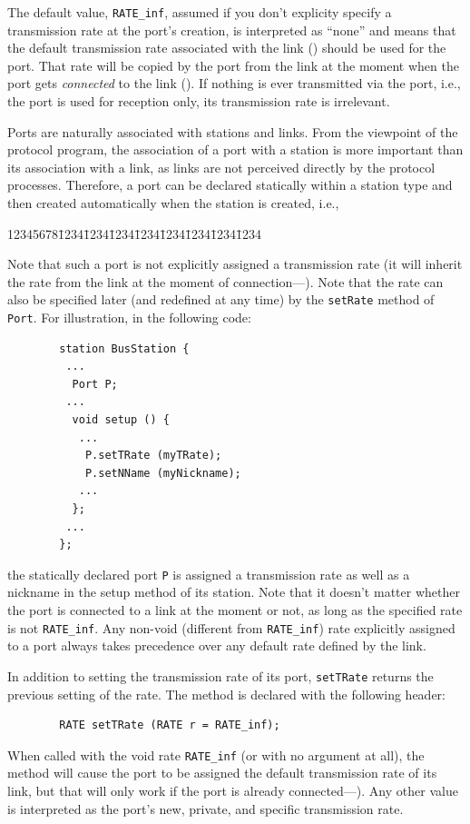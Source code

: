 The default value, {\tt RATE\_inf}, assumed if you don't explicity specify a
transmission rate at the port's creation, is interpreted as ``none'' and
means that the default transmission rate associated with the link
() should be used for the port.
That rate will be copied by the port from the link at the moment when
the port gets
{\em connected\/} to the link ().
If nothing is ever transmitted via the port, i.e., the port
is used for reception only, its transmission rate is irrelevant.

Ports are naturally associated with stations and links.
From the viewpoint of the protocol program, the association of a port
with a station is more important than its association with a link, as
links are not perceived directly by the protocol processes.
Therefore, a port can be declared statically within a
station type and then created automatically when the station is created, i.e.,
{\tt\begin{tabbing}
12345678\=1234\=1234\=1234\=1234\=1234\=1234\=1234\=1234\kill
{}
\end{tabbing}}
\noindent
Note that such a port is not explicitly assigned a transmission rate (it
will inherit the rate from the link at the moment of
connection---).
Note that the rate can also be specified later (and redefined at any time)
by the {\tt setRate} method of {\tt Port}.
For illustration, in the following code:
\begin{verbatim}
        station BusStation {
         ...
          Port P;
         ...
          void setup () {
           ...
            P.setTRate (myTRate);
            P.setNName (myNickname);
           ...
          };
         ...
        };
\end{verbatim}
\noindent
the statically declared port {\tt P} is assigned a transmission rate as well
as a nickname in the setup method of its station.
Note that it doesn't matter whether the port is connected to a link
at the moment
or not, as long as the specified rate is not {\tt RATE\_inf}.
Any non-void (different from {\tt RATE\_inf}) rate explicitly
assigned to a port always takes precedence over any default rate
defined by the link.

In addition to setting the transmission rate of its port, {\tt setTRate}
returns the previous setting of the rate.
The method is declared with the following header:
\begin{verbatim}
        RATE setTRate (RATE r = RATE_inf);
\end{verbatim}
\noindent
When called with the void rate {\tt RATE\_inf}
(or with no argument at all), the method will
cause the port to be assigned the default transmission rate of its
link, but that will only work if the port is already connected---).
Any other value is interpreted as the port's new, private, and specific
transmission rate.

